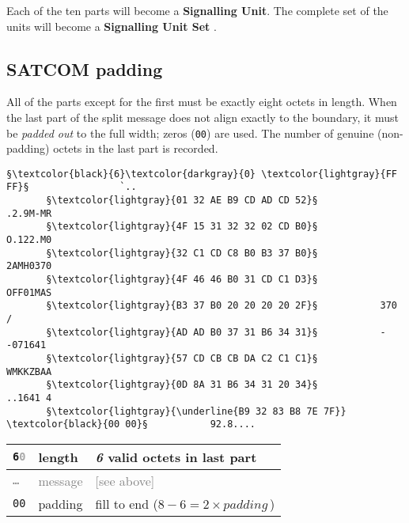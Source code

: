 \documentclass[tikz,a4paper,12pt]{article}
\begin{document}
Each of the ten parts will become a \textbf{Signalling Unit}.  The
complete set of the units will become a
\textbf{Signalling Unit Set} .

\subsection{SATCOM padding}

All of the parts except for the first must be exactly eight octets in
length.  When the last part of the split message does not align
exactly to the boundary, it must be \emph{padded out} to the full width; zeros (\texttt{00}) are used.  The number of genuine (non-padding) octets
in the last part is recorded.

\vspace{0.5em}

\begin{lstlisting}[language=SATCOM,numbers=none]
                      §\textcolor{black}{6}\textcolor{darkgray}{0} \textcolor{lightgray}{FF FF}§                `..
       §\textcolor{lightgray}{01 32 AE B9 CD AD CD 52}§           .2.9M-MR
       §\textcolor{lightgray}{4F 15 31 32 32 02 CD B0}§           O.122.M0
       §\textcolor{lightgray}{32 C1 CD C8 B0 B3 37 B0}§           2AMH0370
       §\textcolor{lightgray}{4F 46 46 B0 31 CD C1 D3}§           OFF01MAS
       §\textcolor{lightgray}{B3 37 B0 20 20 20 20 2F}§           370    /
       §\textcolor{lightgray}{AD AD B0 37 31 B6 34 31}§           --071641
       §\textcolor{lightgray}{57 CD CB CB DA C2 C1 C1}§           WMKKZBAA
       §\textcolor{lightgray}{0D 8A 31 B6 34 31 20 34}§           ..1641 4
       §\textcolor{lightgray}{\underline{B9 32 83 B8 7E 7F}} \textcolor{black}{00 00}§           92.8....
\end{lstlisting}


\begin{center}
\begin{tabular}{p{1.5cm}p{2cm}p{8cm}}
\hfill\texttt{6\textcolor{darkgray}{0}}&length&\emph{6} valid octets in last part\\
\hline
\hfill\textcolor{gray}{\texttt{\ldots}}&\textcolor{gray}{message}&\textcolor{gray}{[see above]}\\
\hline
\hfill\texttt{00}&padding&fill to end ($8-6=2\times padding$\,)\\
\end{tabular}
\end{center}
\end{document}
